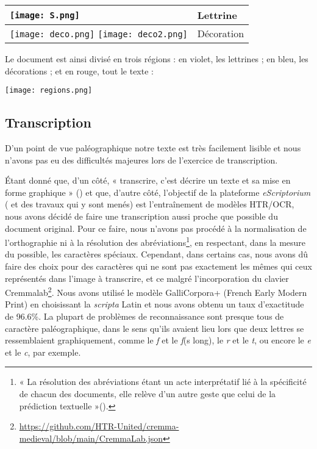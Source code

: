 \documentclass{article}
\begin{document}
 \begin{center}
\begin{tabular}{ |m{3cm}|m{2.5cm}| } 
 \hline
 \texttt{[image: S.png]} & Lettrine \\
 \hline
 \texttt{[image: deco.png]} \texttt{[image: deco2.png]} & Décoration \\ 
  \hline

\end{tabular}
\end{center}   

Le document est ainsi divisé en trois régions : en violet, les lettrines ; en bleu, les décorations ; et en rouge, tout le texte :

\begin{center}
\texttt{[image: regions.png]}


    
\end{center}




\subsection{Transcription}


D'un point de vue paléographique notre texte est très facilement lisible et nous n'avons pas eu des difficultés majeures lors de l'exercice de transcription.

 Étant donné que, d'un côté, « transcrire, c’est décrire un texte et sa mise en forme graphique » (\cite{stutzmann_paleographie_2011}) et que, d'autre côté, l'objectif de la plateforme \textit{eScriptorium} ( et des travaux qui y sont menés) est l'entraînement de modèles HTR/OCR, nous avons décidé de faire une transcription aussi proche que possible du document original. Pour ce faire, nous n'avons pas procédé à la normalisation de l'orthographie ni à la résolution des abréviations\footnote{« La résolution des abréviations étant un acte interprétatif lié à
la spécificité de chacun des documents, elle relève d’un autre geste que celui de la prédiction
textuelle »(\cite{pinche_guide_2022}).}, en respectant, dans la mesure du possible, les caractères spéciaux. Cependant, dans certains cas, nous avons dû faire des choix pour des caractères qui ne sont pas exactement les mêmes qui ceux représentés dans l'image à transcrire, et ce malgré l'incorporation du clavier Cremmalab\footnote{\url{https://github.com/HTR-United/cremma-medieval/blob/main/CremmaLab.json}}. Nous avons utilisé le modèle GalliCorpora+ (French Early Modern Print) en choisissant la \emph{scripta} Latin et nous avons obtenu un taux d'exactitude de 96.6\%. La plupart de problèmes de reconnaissance sont presque tous de caractère paléographique, dans le sens qu'ils avaient lieu lors que deux lettres se ressemblaient graphiquement, comme le \emph{f} et le \emph{ſ}(s long), le \emph{r} et le \emph{t}, ou encore le \emph{e} et le \emph{c}, par exemple.
\end{document}

